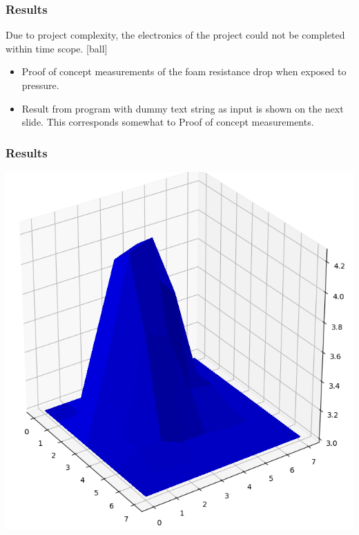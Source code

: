 \documentclass{beamer}
\begin{document}
\begin{frame}
    \frametitle{Results}
        Due to project complexity, the electronics of the project could not be completed within time scope.
    [ball]
    \begin{itemize}
        \item Proof of concept measurements of the foam resistance drop when exposed to pressure.
        \item Result from program with dummy text string as input is shown on the next slide. This corresponds somewhat to Proof of concept measurements.
    \end{itemize}


\end{frame}

\begin{frame}
    \frametitle{Results}
    \begin{center}
        \includegraphics[width=.6\textwidth]{img/foam_plot.png}
    \end{center}

\end{frame}
\end{document}
